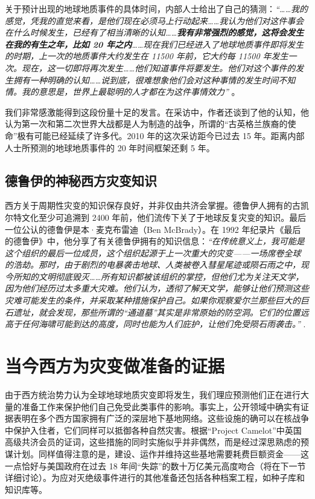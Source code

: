 \documentclass[10pt,twocolumn,letterpaper]{article}
\begin{document}
关于预计出现的地球地质事件的具体时间，内部人士给出了自己的猜测：\textit{“……我的感觉，凭我的直觉来看，是他们现在必须马上行动起来……我认为他们对这件事会在什么时候发生，已经有了相当清晰的认知……\textbf{我有非常强烈的感觉，这将会发生在我的有生之年，比如 20 年之内}……现在我们已经进入了地球地质事件即将发生的时期，上一次的地质事件大约发生在 11500 年前，它大约每 11500 年发生一次。现在，这一切即将再次发生……他们知道事件将要发生。他们对这个事件的发生拥有一种明确的认知……说到底，很难想象他们会对这种事情的发生时间不知情。我的意思是，世界上最聪明的人才都在为这件事情效力”} \cite{4}。

我们非常感激能得到这段份量十足的发言。在采访中，作者还谈到了他的认知，他认为第一次和第二次世界大战都是人为制造的战争，所谓的“古英格兰族裔的使命”极有可能已经延续了许多代。2010 年的这次采访距今已过去 15 年。距离内部人士所预测的地球地质事件的 20 年时间框架还剩 5 年。

\subsection{德鲁伊的神秘西方灾变知识}

西方关于周期性灾变的知识保存良好，并非仅由共济会掌握。德鲁伊人拥有的古凯尔特文化至少可追溯到 2400 年前\cite{7}，他们流传下关了于地球反复灾变的知识。最后一位公认的德鲁伊是本·麦克布雷迪（Ben McBrady）。在 1992 年纪录片《最后的德鲁伊》中，他分享了有关德鲁伊拥有的知识信息：\textit{“在传统意义上，我可能是这个组织的最后一位成员，这个组织起源于上一次重大的灾变——一场席卷全球的浩劫。那时，由于剧烈的电暴袭击地球、人类被卷入彗星尾迹或陨石雨之中，现今所知的文明彻底毁灭……所有知识都被该组织的掌控，但他们尤为关注天文学，因为他们经历过太多重大灾难。他们认为，透彻了解天文学，能够让他们预测这些灾难可能发生的条件，并采取某种措施保护自己。如果你观察爱尔兰那些巨大的巨石遗址，就会发现，那些所谓的“通道墓”其实是非常原始的防空洞。它们的位置远高于任何海啸可能到达的高度，同时也能为人们庇护，让他们免受陨石雨袭击。”} \cite{8,9}.

\section{当今西方为灾变做准备的证据}

由于西方统治势力认为全球地球地质灾变即将发生，我们理应预测他们正在进行大量的准备工作来保护他们自己免受此类事件的影响。事实上，公开领域中确实有证据表明在多个西方国家拥有广泛的深层地下基地网络。这些设施的确可以在核战争中保护入住者，它们同样可以抵御各种自然灾害。根据“Project Camelot”中英国高级共济会员的证词\cite{4,6}，这些措施的同时实施似乎并非偶然，而是经过深思熟虑的预谋计划。同样值得注意的是，建设、运作并维持这些基地需要耗费巨额资金——这一点恰好与美国政府在过去 18 年间“失踪”的数十万亿美元高度吻合（将在下一节详细讨论）\cite{11,12,13}。为应对灭绝级事件进行的其他准备还包括各种档案工程，如种子库和知识库等。
\end{document}
